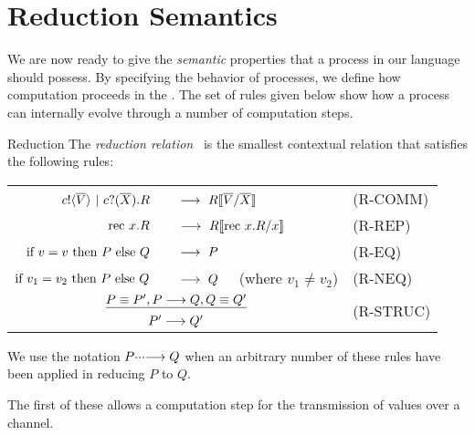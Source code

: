 \section{Reduction Semantics}\label{secreducationsemantics}
We are now ready to give the \emph{semantic} properties that a process in our language should possess.  
By specifying the behavior of processes, we define how computation proceeds in the \picalc.  
The set of rules given below show how a process can internally evolve through a number of computation steps.
\begin{definition}{Reduction}
	The \emph{reduction relation} \pred\ is the smallest contextual relation that satisfies the following rules:
	\begin{center}\begin{tabular}{rll}
		${c}!\langle{ \ensuremath{\overline{V}} }\rangle \ |\  {c}?({\overline{X}}).R$\ &\  $\longrightarrow\  R\llbracket{ \ensuremath{\overline{V}} }/{\overline{X}}\rrbracket$ & \tiny{(R-COMM)}\\
		$\text{rec }{x}.R$\ &\  $\longrightarrow\  R\llbracket{ \ensuremath{\text{rec }{x}.} R}/{x}\rrbracket$ & \tiny{(R-REP)}\\
		$\text{if } {v = v}\text{ then } P \text{ else } Q$\ &\ $\pred\ P$ & \tiny{(R-EQ)}\\
		$\text{if } {v_1 = v_2}\text{ then } P \text{ else } Q$\ &\ $\pred\ Q$ \ \ (where $v_1\neq v_2$)& \tiny{(R-NEQ)}\\
		\multicolumn{2}{c}{\hspace{4.5em}$\underline{P\equiv P', P \longrightarrow Q, Q\equiv Q'}$} & \multirow{2}{*}{\tiny{(R-STRUC)}}\\
		\multicolumn{2}{c}{\hspace{4.5em}$P'\longrightarrow Q'$}
	\end{tabular}\end{center}
	We use the notation $P\cdotp\!\cdotp\!\cdotp\!\longrightarrow Q$ when an arbitrary number of these rules have been applied in reducing $P$ to $Q$.
\end{definition}
The first of these allows a computation step for the transmission of values over a channel.  

